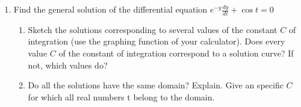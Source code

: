 \documentclass[12pt]{article}
\begin{document}
\begin{enumerate}
\begin{enumerate}
\item Can the solution sketched in (b) be obtained from the general 
solution by choice of constant? 

\end{enumerate}

\item Find the general solution of the differential equation 
$e^{-y}\frac{dy}{dt}+\cos t=0$

\begin{enumerate}

\item Sketch the solutions corresponding to several values of the 
constant $C$ of integration (use the 
graphing function of your calculator). Does every value $C$ 
of the constant of integration correspond 
to a solution curve? If not, which values do? 

\item Do all the solutions have the same domain? Explain. 
Give an specific $C$ for which all real 
numbers t belong to the domain. 

\end{enumerate}

\end{enumerate}
\end{document}
